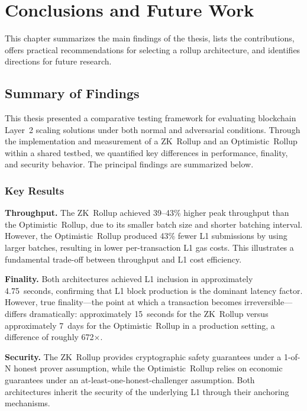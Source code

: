\documentclass[
]{elteikthesis}[2024/04/26]
\begin{document}
\cleardoublepage

\chapter{Conclusions and Future Work}
\label{ch:conclusion}

This chapter summarizes the main findings of the thesis, lists the contributions, offers practical recommendations for selecting a rollup architecture, and identifies directions for future research.

\section{Summary of Findings}

This thesis presented a comparative testing framework for evaluating blockchain Layer~2 scaling solutions under both normal and adversarial conditions. Through the implementation and measurement of a ZK~Rollup and an Optimistic~Rollup within a shared testbed, we quantified key differences in performance, finality, and security behavior. The principal findings are summarized below.

\subsection{Key Results}

\textbf{Throughput.}
The ZK~Rollup achieved 39--43\% higher peak throughput than the Optimistic~Rollup, due to its smaller batch size and shorter batching interval. However, the Optimistic~Rollup produced 43\% fewer L1 submissions by using larger batches, resulting in lower per-transaction L1 gas costs. This illustrates a fundamental trade-off between throughput and L1 cost efficiency.

\textbf{Finality.}
Both architectures achieved L1 inclusion in approximately 4.75~seconds, confirming that L1 block production is the dominant latency factor. However, true finality---the point at which a transaction becomes irreversible---differs dramatically: approximately 15~seconds for the ZK~Rollup versus approximately 7~days for the Optimistic~Rollup in a production setting, a difference of roughly 672$\times$.

\textbf{Security.}
The ZK~Rollup provides cryptographic safety guarantees under a 1-of-N honest prover assumption, while the Optimistic~Rollup relies on economic guarantees under an at-least-one-honest-challenger assumption. Both architectures inherit the security of the underlying L1 through their anchoring mechanisms.
\end{document}
